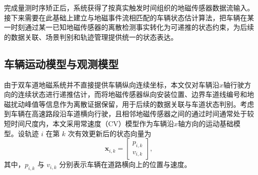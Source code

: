 \documentclass{xdupgthesis}
\begin{document}
完成量测时序矫正后，系统获得了按真实触发时间组织的地磁传感器数据流输入。接下来需要在此基础上建立与地磁事件流相匹配的车辆状态估计算法，把车辆在某一时刻通过某一已知地磁传感器的离散检测事实转化为可递推的状态约束，为后续的数据关联、场景判别和轨迹管理提供统一的状态表达。


\subsection{车辆运动模型与观测模型}

由于双车道地磁系统并不直接提供车辆纵向连续坐标，本文仅对车辆沿$x$轴行驶方向的连续状态进行递推估计，而将地磁传感器纵向安装位置、边界车道线编号和地磁扰动峰值等信息作为离散证据保留，用于后续的数据关联与车道状态判别。考虑到车辆在高速路段沿车道横向行驶，且相邻地磁传感器之间的通过时间通常处于较短时间尺度内，本文采用常速度（CV）模型作为车辆沿$x$轴方向的运动基础模型。设轨迹 $i$ 在第 $k$ 次有效更新后的状态向量为
\begin{equation}
	\mathbf x_{i,k}=
	\begin{bmatrix}
		p_{i,k}\\
		v_{i,k}
	\end{bmatrix},
	\label{eq:ch3_state_vec}
\end{equation}
其中，$p_{i,k}$ 与 $v_{i,k}$ 分别表示车辆在道路横向上的位置与速度。
\end{document}
